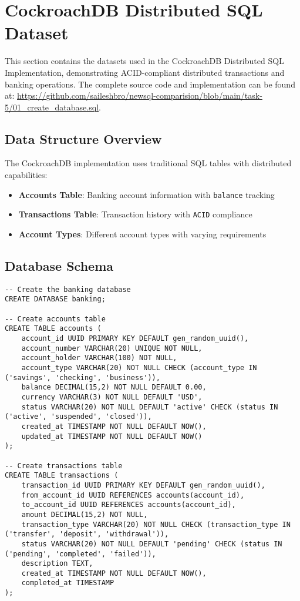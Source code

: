 \section{CockroachDB Distributed SQL Dataset}

This section contains the datasets used in the CockroachDB Distributed SQL Implementation, demonstrating ACID-compliant distributed transactions and banking operations. The complete source code and implementation can be found at: \url{https://github.com/saileshbro/newsql-comparision/blob/main/task-5/01_create_database.sql}.

\subsection{Data Structure Overview}

The CockroachDB implementation uses traditional SQL tables with distributed capabilities:
\begin{itemize}
    \item \textbf{Accounts Table}: Banking account information with \texttt{balance} tracking
    \item \textbf{Transactions Table}: Transaction history with \texttt{ACID} compliance
    \item \textbf{Account Types}: Different account types with varying requirements
\end{itemize}

\subsection{Database Schema}

\begin{verbatim}
-- Create the banking database
CREATE DATABASE banking;

-- Create accounts table
CREATE TABLE accounts (
    account_id UUID PRIMARY KEY DEFAULT gen_random_uuid(),
    account_number VARCHAR(20) UNIQUE NOT NULL,
    account_holder VARCHAR(100) NOT NULL,
    account_type VARCHAR(20) NOT NULL CHECK (account_type IN ('savings', 'checking', 'business')),
    balance DECIMAL(15,2) NOT NULL DEFAULT 0.00,
    currency VARCHAR(3) NOT NULL DEFAULT 'USD',
    status VARCHAR(20) NOT NULL DEFAULT 'active' CHECK (status IN ('active', 'suspended', 'closed')),
    created_at TIMESTAMP NOT NULL DEFAULT NOW(),
    updated_at TIMESTAMP NOT NULL DEFAULT NOW()
);

-- Create transactions table
CREATE TABLE transactions (
    transaction_id UUID PRIMARY KEY DEFAULT gen_random_uuid(),
    from_account_id UUID REFERENCES accounts(account_id),
    to_account_id UUID REFERENCES accounts(account_id),
    amount DECIMAL(15,2) NOT NULL,
    transaction_type VARCHAR(20) NOT NULL CHECK (transaction_type IN ('transfer', 'deposit', 'withdrawal')),
    status VARCHAR(20) NOT NULL DEFAULT 'pending' CHECK (status IN ('pending', 'completed', 'failed')),
    description TEXT,
    created_at TIMESTAMP NOT NULL DEFAULT NOW(),
    completed_at TIMESTAMP
);
\end{verbatim}

